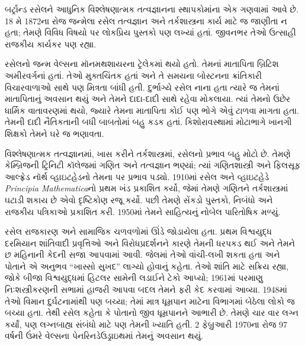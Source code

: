 \documentclass[../../../include/open-logic-section]{subfiles}
\begin{document}





બર્ટ્રાન્ડ રસેલને આધુનિક
વિશ્લેષણાત્મક તત્વજ્ઞાનના
સ્થાપકોમાંના એક ગણવામાં
આવે છે. 18 મે 1872ના રોજ
જન્મેલા રસેલ તત્વજ્ઞાન અને
તર્કશાસ્ત્રના કાર્ય માટે
જ જાણીતા ન હતા; તેમણે
વિવિધ વિષયો પર લોકપ્રિય
પુસ્તકો પણ લખ્યાં હતાં.
જીવનભર તેઓ ઉત્સાહી
રાજકીય કાર્યકર પણ રહ્યા.

રસેલનો જન્મ વેલ્સના
મૉનમથશાયરના ટ્રેલેકમાં
થયો હતો. તેમનાં માતાપિતા
બ્રિટિશ અમીરવર્ગનાં હતાં.
તેઓ મુક્તચિંતક હતાં અને
તે સમયના બોસ્ટનના
ક્રાંતિકારી વિચારવાળાઓ
સાથે પણ મિત્રતા બાંધી
હતી. દુર્ભાગ્યે રસેલ
નાના હતા ત્યારે જ
તેમનાં માતાપિતાનું
અવસાન થયું અને
તેમને દાદા-દાદી
સાથે રહેવા મોકલાયા.
ત્યાં તેમનો ઉછેર
ધાર્મિક વાતાવરણમાં
થયો, જ્યારે તેમના
માતાપિતા કોઈ પણ
ભોગે એવું ટાળવા
માગતા હતા. તેમની
દાદી નૈતિકતાની
બધી બાબતોમાં બહુ
કડક હતાં. કિશોરાવસ્થામાં
મોટાભાગે ખાનગી
શિક્ષકો તેમને ઘરે
જ ભણાવતા.

વિશ્લેષણાત્મક તત્વજ્ઞાનમાં,
ખાસ કરીને તર્કશાસ્ત્રમાં,
રસેલનો પ્રભાવ બહુ મોટો
છે. તેમણે કેમ્બ્રિજની
ટ્રિનિટી કૉલેજમાં
ગણિત અને તત્વજ્ઞાન
ભણ્યાં; ત્યાં ગણિતશાસ્ત્રી
અને ફિલસૂફ આલ્ફ્રેડ
નૉર્થ વ્હાઇટહેડનો
તેમના પર પ્રભાવ
પડ્યો. 1910માં રસેલ
અને વ્હાઇટહેડે
\emph{Principia Mathematica}નો
પ્રથમ ખંડ પ્રકાશિત
કર્યો, જેમાં તેમણે
ગણિતને તર્કશાસ્ત્રમાં
ઘટાડી શકાય છે એવો
દૃષ્ટિકોણ રજૂ કર્યો.
પછી તેમણે સેંકડો
પુસ્તકો, નિબંધો અને
રાજકીય પત્રિકાઓ
પ્રકાશિત કરી. 1950માં
તેમને સાહિત્યનું
નોબેલ પારિતોષિક મળ્યું.

રસેલ રાજકારણ અને
સામાજિક ચળવળોમાં
ઊંડે જોડાયેલા હતા.
પ્રથમ વિશ્વયુદ્ધ
દરમિયાન શાંતિવાદી
પ્રવૃત્તિઓ અને
વિરોધપ્રદર્શનને
કારણે તેમની
ધરપકડ થઈ અને
તેમને છ મહિનાની
કેદની સજા
આપવામાં આવી. જેલમાં
તેઓ વાંચી-લખી
શકતા હતા અને
પોતાને એ અનુભવ
“ખાસ્સો સુખદ”
લાગ્યો હોવાનું
કહેતા. તેઓ શાંતિ માટે
સક્રિય રહ્યા, જોકે બીજા વિશ્વયુદ્ધમાં
હિટલર સામેની લડાઈને ટેકો આપ્યો;
1961માં પરમાણુ
નિઃશસ્ત્રીકરણની
સભામાં હાજરી
આપવા બદલ તેમને
ફરી કેદ કરવામાં
આવ્યા. 1948માં
તેઓ વિમાન દુર્ઘટનામાંથી
પણ બચ્યા; તેમાં
માત્ર ધૂમ્રપાન
માટેના વિભાગમાં
બેઠેલા લોકો જ
બચ્યા હતા. તેથી
રસેલ કહેતા કે
પોતાનો જીવ
ધૂમ્રપાનને આભારી
છે. તેમણે ચાર
વાર લગ્ન કર્યાં,
પણ લગ્નબાહ્ય
સંબંધો માટે પણ
તેમની ખ્યાતિ હતી.
2 ફેબ્રુઆરી 1970ના
રોજ 97 વર્ષની
ઉંમરે વેલ્સના
પેનરિનડેઉડ્રાઇથમાં
તેમનું અવસાન થયું.
\end{document}

